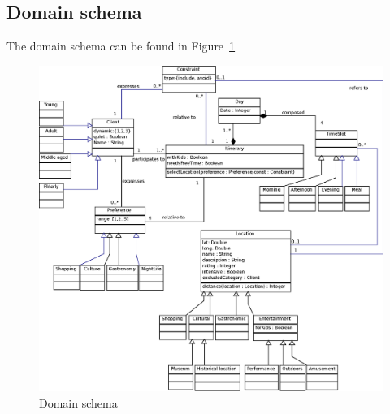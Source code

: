 \documentclass[11pt]{article} %
\begin{document}
\subsection{Domain schema} \label{sec:domain}
The domain schema can be found in Figure~\ref{fig:ClassDiagram}

\begin{figure}[h]
\centering
\includegraphics[width=\textwidth]{images/domain.eps}
\caption{Domain schema}
\label{fig:ClassDiagram}
\end{figure}
\end{document}
